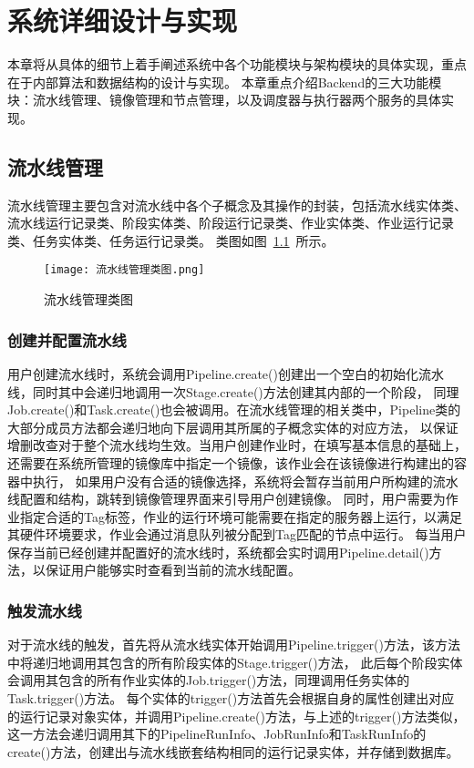 
\chapter{系统详细设计与实现}
本章将从具体的细节上着手阐述系统中各个功能模块与架构模块的具体实现，重点在于内部算法和数据结构的设计与实现。
本章重点介绍Backend的三大功能模块：流水线管理、镜像管理和节点管理，以及调度器与执行器两个服务的具体实现。

\section{流水线管理}
流水线管理主要包含对流水线中各个子概念及其操作的封装，包括流水线实体类、流水线运行记录类、阶段实体类、阶段运行记录类、作业实体类、作业运行记录类、任务实体类、任务运行记录类。
类图如图~\ref{fig:流水线管理类图}~所示。
\begin{figure}[h]
  \centering
  \texttt{[image: 流水线管理类图.png]}
  \caption{流水线管理类图}
  \label{fig:流水线管理类图}
\end{figure}

\subsection{创建并配置流水线}

用户创建流水线时，系统会调用Pipeline.create()创建出一个空白的初始化流水线，同时其中会递归地调用一次Stage.create()方法创建其内部的一个阶段，
同理Job.create()和Task.create()也会被调用。在流水线管理的相关类中，Pipeline类的大部分成员方法都会递归地向下层调用其所属的子概念实体的对应方法，
以保证增删改查对于整个流水线均生效。当用户创建作业时，在填写基本信息的基础上，还需要在系统所管理的镜像库中指定一个镜像，该作业会在该镜像进行构建出的容器中执行，
如果用户没有合适的镜像选择，系统将会暂存当前用户所构建的流水线配置和结构，跳转到镜像管理界面来引导用户创建镜像。
同时，用户需要为作业指定合适的Tag标签，作业的运行环境可能需要在指定的服务器上运行，以满足其硬件环境要求，作业会通过消息队列被分配到Tag匹配的节点中运行。
每当用户保存当前已经创建并配置好的流水线时，系统都会实时调用Pipeline.detail()方法，以保证用户能够实时查看到当前的流水线配置。

\subsection{触发流水线}

对于流水线的触发，首先将从流水线实体开始调用Pipeline.trigger()方法，该方法中将递归地调用其包含的所有阶段实体的Stage.trigger()方法，
此后每个阶段实体会调用其包含的所有作业实体的Job.trigger()方法，同理调用任务实体的Task.trigger()方法。
每个实体的trigger()方法首先会根据自身的属性创建出对应的运行记录对象实体，并调用Pipeline.create()方法，与上述的trigger()方法类似，
这一方法会递归调用其下的PipelineRunInfo、JobRunInfo和TaskRunInfo的create()方法，创建出与流水线嵌套结构相同的运行记录实体，并存储到数据库。

